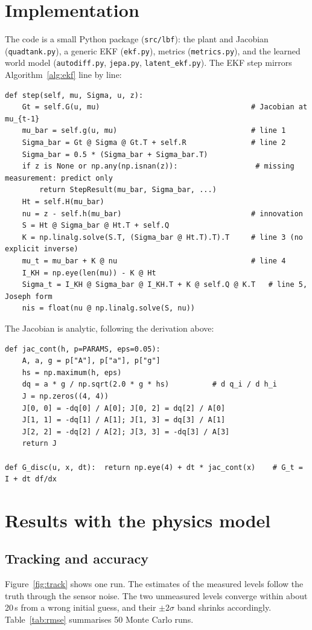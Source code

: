 \documentclass[11pt]{article}
\begin{document}
\section{Implementation}
The code is a small Python package (\texttt{src/lbf}): the plant and Jacobian (\texttt{quadtank.py}), a generic EKF (\texttt{ekf.py}), metrics (\texttt{metrics.py}), and the learned world model (\texttt{autodiff.py}, \texttt{jepa.py}, \texttt{latent\_ekf.py}). The EKF step mirrors Algorithm~\ref{alg:ekf} line by line:
\begin{lstlisting}
def step(self, mu, Sigma, u, z):
    Gt = self.G(u, mu)                                   # Jacobian at mu_{t-1}
    mu_bar = self.g(u, mu)                               # line 1
    Sigma_bar = Gt @ Sigma @ Gt.T + self.R               # line 2
    Sigma_bar = 0.5 * (Sigma_bar + Sigma_bar.T)
    if z is None or np.any(np.isnan(z)):                  # missing measurement: predict only
        return StepResult(mu_bar, Sigma_bar, ...)
    Ht = self.H(mu_bar)
    nu = z - self.h(mu_bar)                              # innovation
    S = Ht @ Sigma_bar @ Ht.T + self.Q
    K = np.linalg.solve(S.T, (Sigma_bar @ Ht.T).T).T     # line 3 (no explicit inverse)
    mu_t = mu_bar + K @ nu                               # line 4
    I_KH = np.eye(len(mu)) - K @ Ht
    Sigma_t = I_KH @ Sigma_bar @ I_KH.T + K @ self.Q @ K.T   # line 5, Joseph form
    nis = float(nu @ np.linalg.solve(S, nu))
\end{lstlisting}
The Jacobian is analytic, following the derivation above:
\begin{lstlisting}
def jac_cont(h, p=PARAMS, eps=0.05):
    A, a, g = p["A"], p["a"], p["g"]
    hs = np.maximum(h, eps)
    dq = a * g / np.sqrt(2.0 * g * hs)          # d q_i / d h_i
    J = np.zeros((4, 4))
    J[0, 0] = -dq[0] / A[0]; J[0, 2] = dq[2] / A[0]
    J[1, 1] = -dq[1] / A[1]; J[1, 3] = dq[3] / A[1]
    J[2, 2] = -dq[2] / A[2]; J[3, 3] = -dq[3] / A[3]
    return J

def G_disc(u, x, dt):  return np.eye(4) + dt * jac_cont(x)    # G_t = I + dt df/dx
\end{lstlisting}

\section{Results with the physics model}
\subsection{Tracking and accuracy}
Figure~\ref{fig:track} shows one run. The estimates of the measured levels follow the truth through the sensor noise. The two unmeasured levels converge within about 20\,s from a wrong initial guess, and their $\pm2\sigma$ band shrinks accordingly. Table~\ref{tab:rmse} summarises 50 Monte Carlo runs.
\end{document}
